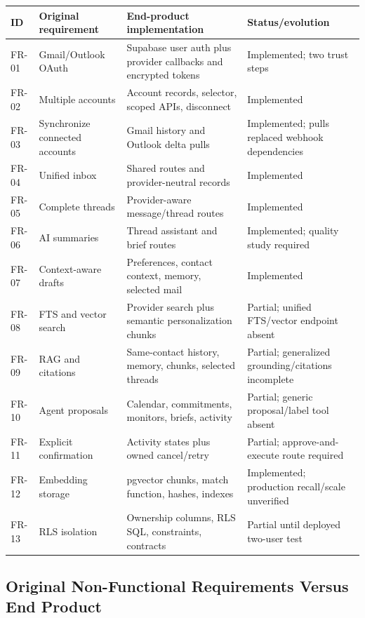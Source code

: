 \documentclass[
]{report}
\begin{document}
\begin{longtable}[]{@{}p{}p{}p{}p{}@{}}
\toprule\noalign{}
ID & Original requirement & End-product implementation & Status/evolution \\
\midrule\noalign{}
\endhead
\bottomrule\noalign{}
\endlastfoot
FR-01 & Gmail/Outlook OAuth & Supabase user auth plus provider callbacks and encrypted tokens & Implemented; two trust steps \\
FR-02 & Multiple accounts & Account records, selector, scoped APIs, disconnect & Implemented \\
FR-03 & Synchronize connected accounts & Gmail history and Outlook delta pulls & Implemented; pulls replaced webhook dependencies \\
FR-04 & Unified inbox & Shared routes and provider-neutral records & Implemented \\
FR-05 & Complete threads & Provider-aware message/thread routes & Implemented \\
FR-06 & AI summaries & Thread assistant and brief routes & Implemented; quality study required \\
FR-07 & Context-aware drafts & Preferences, contact context, memory, selected mail & Implemented \\
FR-08 & FTS and vector search & Provider search plus semantic personalization chunks & Partial; unified FTS/vector endpoint absent \\
FR-09 & RAG and citations & Same-contact history, memory, chunks, selected threads & Partial; generalized grounding/citations incomplete \\
FR-10 & Agent proposals & Calendar, commitments, monitors, briefs, activity & Partial; generic proposal/label tool absent \\
FR-11 & Explicit confirmation & Activity states plus owned cancel/retry & Partial; approve-and-execute route required \\
FR-12 & Embedding storage & pgvector chunks, match function, hashes, indexes & Implemented; production recall/scale unverified \\
FR-13 & RLS isolation & Ownership columns, RLS SQL, constraints, contracts & Partial until deployed two-user test \\
\end{longtable}

\subsection{Original Non-Functional Requirements Versus End Product}
\end{document}

